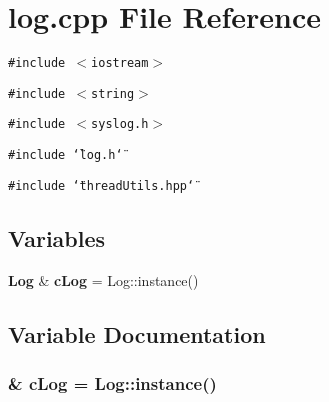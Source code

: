 \section{log.cpp File Reference}
\label{log_8cpp}
{\tt \#include $<$iostream$>$}\par
{\tt \#include $<$string$>$}\par
{\tt \#include $<$syslog.h$>$}\par
{\tt \#include \char`\"{}log.h\char`\"{}}\par
{\tt \#include \char`\"{}thread\-Utils.hpp\char`\"{}}\par
\subsection*{Variables}
\begin{CompactItemize}
\item 
{\bf Log} \& {\bf c\-Log} = Log::instance()
\end{CompactItemize}


\subsection{Variable Documentation}
\subsubsection{\& {\bf c\-Log} = Log::instance()}\label{log_8cpp_dabafeab912880de79e232735f44ce33}


